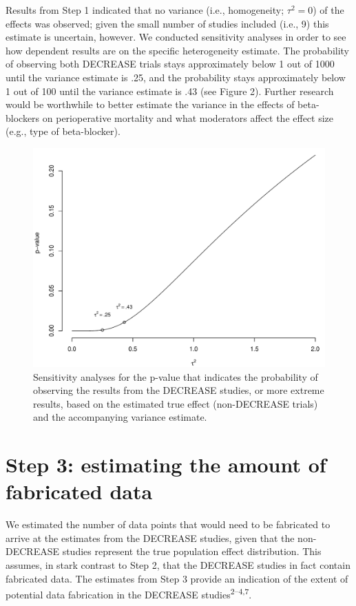 \documentclass[]{article}
\begin{document}
Results from Step 1 indicated that no variance (i.e., homogeneity;
\(\tau^2=0\)) of the effects was observed; given the small number of
studies included (i.e., 9) this estimate is uncertain, however. We
conducted sensitivity analyses in order to see how dependent results are
on the specific heterogeneity estimate. The probability of observing
both DECREASE trials stays approximately below 1 out of 1000 until the
variance estimate is .25, and the probability stays approximately below
1 out of 100 until the variance estimate is .43 (see Figure 2). Further
research would be worthwhile to better estimate the variance in the
effects of beta-blockers on perioperative mortality and what moderators
affect the effect size (e.g., type of beta-blocker).

\begin{figure}

{\centering \includegraphics[width=0.8\linewidth]{../figures/fig2} 

}

\caption{Sensitivity analyses for the p-value that indicates the probability of observing the results from the DECREASE studies, or more extreme results, based on the estimated true effect (non-DECREASE trials) and the accompanying variance estimate.}\label{fig:figure 2}
\end{figure}

\section{Step 3: estimating the amount of fabricated
data}\label{step-3-estimating-the-amount-of-fabricated-data}

We estimated the number of data points that would need to be fabricated
to arrive at the estimates from the DECREASE studies, given that the
non-DECREASE studies represent the true population effect distribution.
This assumes, in stark contrast to Step 2, that the DECREASE studies in
fact contain fabricated data. The estimates from Step 3 provide an
indication of the extent of potential data fabrication in the DECREASE
studies\textsuperscript{2--4,7}.
\end{document}
